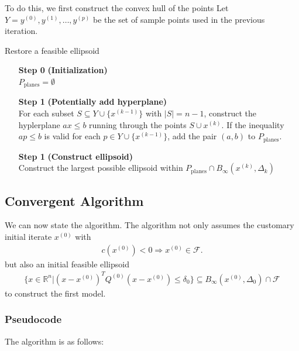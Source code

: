 \documentclass{article}
\theoremstyle{case}
\numberwithin{theorem}{subsection}
\newcommand{\dk}{\Delta_k}
\newcommand{\feasible}{{\mathcal F}}
\newcommand{\Rn}{\mathbb R^n}
\newcommand{\tr}{{ B_{\infty}\left(\xk, \dk\right) }}
\newcommand{\xk}{x^{(k)}}
\newcommand{\xinit}{{x^{(0)}}}
\begin{document}
To do this, we first construct the convex hull of the points 
Let $Y = y^{(0)}, y^{(1)}, \ldots, y^{(p)}$ be the set of sample points used in the previous iteration.

\begin{algorithm}[H]
    \caption{Restore a feasible ellipsoid}
    \label{restore_feasible_ellipsoid}
    \begin{itemize}
        \item[\textbf{Step 0}] \textbf{(Initialization)} \\
            $P_{\textrm{planes}} = \emptyset$
            
        \item[\textbf{Step 1}] \textbf{(Potentially add hyperplane)} \\
	    For each subset $S \subseteq Y \cup \{x^{(k-1)}\}$ with $|S| = n - 1$, construct the hyplerplane $ax\le b$ running through the points $S \cup \xk$.
	    If the inequality $ap \le b$ is valid for each $p \in Y \cup \{x^{(k-1)}\}$, add the pair $(a, b)$ to $P_{\textrm{planes}}$.
	
	\item[\textbf{Step 1}] \textbf{(Construct ellipsoid)} \\
	   Construct the largest possible ellipsoid within $P_{\textrm{planes}} \cap \tr$
    \end{itemize}
\end{algorithm}


\subsection{Convergent Algorithm}

We can now state the algorithm.
The algorithm not only assumes the customary initial iterate $ \xinit $ with 
\begin{align}
\label{initial_point_is_feasible}
c\left(\xinit\right) < 0 \Longrightarrow \xinit \in \feasible.
\end{align}
but also an initial feasible ellipsoid
\begin{align}
\{x \in\Rn | (x - \xinit)^T Q^{(0)} (x - \xinit) \le \delta_0 \} \subseteq B_{\infty}\left(\xinit, \Delta_{0}\right) \cap \feasible \label{initial_ellipsoid}
\end{align}
to construct the first model.


\subsubsection{Pseudocode}
The algorithm is as follows:
\end{document}
